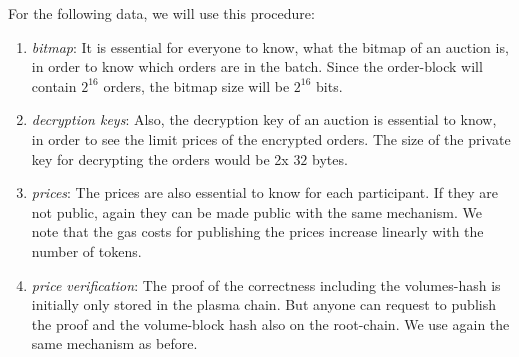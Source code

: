 \documentclass[11pt,parskip=full]{scrartcl}%
\begin{document}
For the following data, we will use this procedure:
\begin{enumerate}
\item \emph{bitmap}:
It is essential for everyone to know, what the bitmap of an auction is, in order to know which orders are in the batch. Since the order-block will contain $2^{16}$ orders, the bitmap size will be $2^{16}$ bits. 


\item \emph{decryption keys}:
Also, the decryption key of an auction is essential to know, in order to see the limit prices of the encrypted orders. 
The size of the private key for decrypting the orders would be 2x $32$ bytes.

\item \emph{prices}:
The prices are also essential to know for each participant. 
If they are not public, again they can be made public with the same mechanism. 
We note that the gas costs for publishing the prices increase linearly with the number of tokens.

\item \emph{price verification}:
The proof of the correctness including the volumes-hash is initially only stored in the plasma chain. 
But anyone can request to publish the proof and the volume-block hash also on the root-chain. 
We use again the same mechanism as before. 
\end{enumerate}
\end{document}
